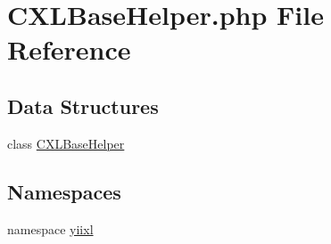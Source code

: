 \hypertarget{CXLBaseHelper_8php}{
\section{CXLBaseHelper.php File Reference}
\label{CXLBaseHelper_8php}
}
\subsection*{Data Structures}
\begin{DoxyCompactItemize}
\item 
class \hyperlink{classCXLBaseHelper}{CXLBaseHelper}
\end{DoxyCompactItemize}
\subsection*{Namespaces}
\begin{DoxyCompactItemize}
\item 
namespace \hyperlink{namespaceyiixl}{yiixl}
\end{DoxyCompactItemize}
